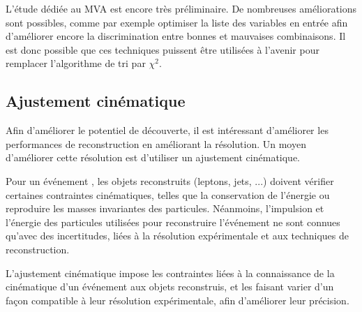\bigskip

L'étude dédiée au MVA est encore très préliminaire. De nombreuses améliorations sont possibles, comme par exemple optimiser la liste des variables en entrée afin d'améliorer encore la discrimination entre bonnes et mauvaises combinaisons. Il est donc possible que ces techniques puissent être utilisées à l'avenir pour remplacer l'algorithme de tri par $\chi^2$.

\subsection{Ajustement cinématique} \label{sec:mtt_kf}

Afin d'améliorer le potentiel de découverte, il est intéressant d'améliorer les performances de reconstruction en améliorant la résolution. Un moyen d'améliorer cette résolution est d'utiliser un ajustement cinématique.

\bigskip

Pour un événement \ttbar, les objets reconstruits (leptons, jets, ...) doivent vérifier certaines contraintes cinématiques, telles que la conservation de l'énergie ou reproduire les masses invariantes des particules. Néanmoins, l'impulsion et l'énergie des particules utilisées pour reconstruire l'événement \ttbar ne sont connues qu'avec des incertitudes, liées à la résolution expérimentale et aux techniques de reconstruction.

\medskip

L'ajustement cinématique impose les contraintes liées à la connaissance de la cinématique d'un événement \ttbar aux objets reconstruis, et les faisant varier d'un façon compatible à leur résolution expérimentale, afin d'améliorer leur précision.

